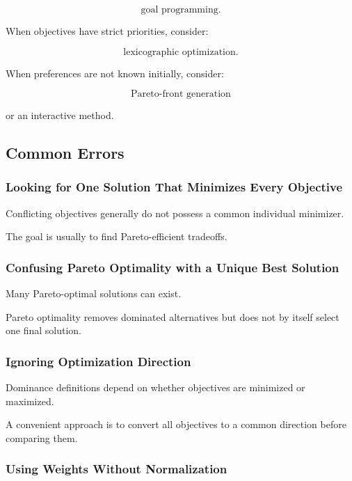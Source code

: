 \[
\boxed{
\text{goal programming}.
}
\]

When objectives have strict priorities, consider:

\[
\boxed{
\text{lexicographic optimization}.
}
\]

When preferences are not known initially, consider:

\[
\boxed{
\text{Pareto-front generation}
}
\]

or an interactive method.

\subsection{Common Errors}
\label{subsec:multiobjective-common-errors}

\subsubsection{Looking for One Solution That Minimizes Every Objective}

Conflicting objectives generally do not possess a common individual
minimizer.

The goal is usually to find Pareto-efficient tradeoffs.

\subsubsection{Confusing Pareto Optimality with a Unique Best Solution}

Many Pareto-optimal solutions can exist.

Pareto optimality removes dominated alternatives but does not by itself
select one final solution.

\subsubsection{Ignoring Optimization Direction}

Dominance definitions depend on whether objectives are minimized or
maximized.

A convenient approach is to convert all objectives to a common direction
before comparing them.

\subsubsection{Using Weights Without Normalization}

